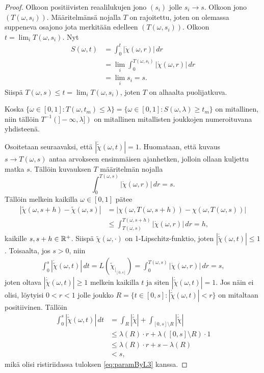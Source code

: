 \documentclass[12pt,oneside,a4paper]{amsbook} %
\begin{document}
\begin{proof}
    Olkoon positiivisten reaalilukujen jono $(s_i)$ jolle $s_i \to s$. Olkoon jono $(T(\omega, s_i))$. Määritelmänsä nojalla $T$ on rajoitettu, joten on olemassa suppeneva osajono jota merkitään edelleen $(T(\omega, s_i))$. Olkoon $t = \lim_i T(\omega, s_i)$. Nyt
    \begin{align*}
        S(\omega, t) &= \int_0^t |\dot\chi(\omega, r)| \, dr \\
        &= \lim_i\int_0^{T(\omega, s_i)} |\dot\chi(\omega, r)| \, dr \\
        &= \lim_i s_i = s.
    \end{align*}
    Siispä $T(\omega, s) \le t = \lim_i T(\omega, s_i)$, joten $T$ on alhaalta puolijatkuva.
    
    Koska $\{\omega \in [0, 1] : T(\omega, t_m) \le \lambda\} = \{\omega\in [0, 1] : S(\omega, \lambda) \ge t_m\}$ on mitallinen, niin tällöin $T^{-1}(]-\infty, \lambda])$ on mitallinen mitallisten joukkojen numeroituvana yhdisteenä.
    
    Osoitetaan seuraavaksi, että $|\dot{\tilde{\chi}}(\omega, t)| = 1$. Huomataan, että kuvaus $s\to T(\omega, s)$ antaa arvokseen ensimmäisen ajanhetken, jolloin ollaan kuljettu matka $s$. Tällöin kuvauksen $T$ määritelmän nojalla 
    \begin{equation} \label{eq:paramByL1}
        \int_0^{T(\omega,s)} |\dot \chi(\omega, r)| \, dr = s.
    \end{equation}
    Tällöin melkein kaikilla $\omega \in [0, 1]$ pätee
    \begin{align*}
        |\tilde\chi(\omega, s + h) - \tilde\chi(\omega, s)| &= |\chi(\omega, T(\omega, s+h)) - \chi(\omega, T(\omega, s))| \\
        &\le \int_{T(\omega,s)}^{T(\omega, s+h)}|\dot \chi(\omega, r)| \, dr = h,
    \end{align*}
    kaikille $s, s+h \in {\mathbb{R}^{+}}$. Siispä $\tilde \chi(\omega, \cdot)$ on 1-Lipschitz-funktio, joten $|\dot{\tilde \chi}(\omega, t)| \le 1$. Toisaalta, jos $s > 0$, niin
    \begin{align}
        \label{eq:paramByL3} \int_0^s |\dot{\tilde \chi}(\omega, t)| \, dt = L(\tilde\chi_{|_{[0, s]}})= \int_0^{T(\omega, s)} |\dot \chi(\omega, r)| \, dr = s,
    \end{align}
    joten oltava $|\dot{\tilde \chi}(\omega, t)| \ge 1$ melkein kaikilla $t$ ja siten $|\dot{\tilde \chi}(\omega, t)| = 1$. Jos näin ei olisi, löytyisi $0 < r < 1$ jolle joukko $R = \{t \in [0, s] : |\dot{\tilde \chi}(\omega, t)|< r\}$ on mitaltaan positiivinen. Tällöin
    \begin{align*}
        \int_0^s |\dot{\tilde \chi}(\omega, t)| \, dt &= \int_R |\dot{\tilde \chi}| + \int_{[0,s]\setminus R} |\dot{\tilde \chi}| \\
        &\le \lambda(R) \cdot r + \lambda([0,s]\setminus R) \cdot 1 \\
        &\le \lambda(R) \cdot r + s - \lambda(R) \\
        &< s,
    \end{align*}
    mikä olisi ristiriidassa tuloksen \eqref{eq:paramByL3} kanssa.


\end{proof}
\end{document}

